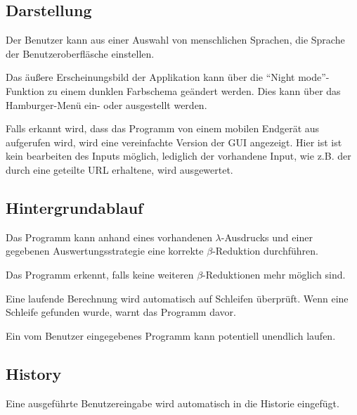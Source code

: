 \documentclass[parskip=full,11pt,twoside]{scrartcl}
\begin{document}
\subsection{Darstellung}

Der Benutzer kann aus einer Auswahl von menschlichen Sprachen, die Sprache der Benutzeroberfläsche einstellen.

Das äußere Erscheinungsbild der Applikation kann über die \enquote{Night mode}-Funktion zu einem dunklen Farbschema geändert werden. Dies kann über das Hamburger-Menü ein- oder ausgestellt werden.

Falls erkannt wird, dass das Programm von einem mobilen Endgerät aus aufgerufen wird, wird eine vereinfachte Version der GUI angezeigt. Hier ist ist kein bearbeiten des Inputs möglich, lediglich der vorhandene Input, wie z.B. der durch eine geteilte URL erhaltene, wird ausgewertet.




\subsection{Hintergrundablauf}

Das Programm kann anhand eines vorhandenen $\lambda$-Ausdrucks und einer gegebenen Auswertungsstrategie eine korrekte $\beta$-Reduktion durchführen.

Das Programm erkennt, falls keine weiteren $\beta$-Reduktionen mehr möglich sind.

Eine laufende Berechnung wird automatisch auf Schleifen überprüft. Wenn eine Schleife gefunden wurde, warnt das Programm davor.

Ein vom Benutzer eingegebenes Programm kann potentiell unendlich laufen.




\subsection{History}

Eine ausgeführte Benutzereingabe wird automatisch in die Historie eingefügt.
\end{document}
